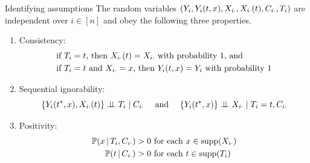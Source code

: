 \documentclass[aspectratio=169]{beamer}
\theoremstyle{remark}
\begin{document}
\begin{frame}{Identifying assumptions}
    The random variables $(Y_i, Y_i(t, x), X_{i \cdot}, X_{i \cdot}(t), C_{i \cdot}, T_i)$ are independent over $i \in [n]$ and obey the following three properties.
    \begin{enumerate}
        \item Consistency: \vspace{-3mm}
              \begin{equation*} \begin{aligned}
                       & \text{if $T_i = t$, then $\X_{i \cdot}(t) = \X_{i \cdot}$ with probability 1, and}    \\
                       & \text{if $T_i = t$ and $\X_{i \cdot} = x$, then $Y_i(t, x) = Y_i$ with probability 1}
                      \vspace{-2mm}
                  \end{aligned} \end{equation*}
        \item Sequential ignorability:
              \begin{equation*}
                  \{Y_i(t^*, x), X_{i \cdot}(t)\} \perp \!\!\! \perp T_i \mid C_{i \cdot}
                  ~~~\text{ and }~~~
                  \{Y_i(t^*, x)\} \perp \!\!\! \perp X_{i \cdot}  \mid T_i = t, C_{i \cdot}
              \end{equation*}
        \item Positivity:
              \begin{equation*}
                  \begin{aligned}
                      \P[T_i, \C_{i \cdot}]{x} & > 0 \text{ for each }  x \in \supp(\X_{i \cdot}) \\
                      \P[\C_{i \cdot}]{t}      & > 0 \text{ for each }  t \in \supp(T_i)
                  \end{aligned}
              \end{equation*}
    \end{enumerate}
\end{frame}
\end{document}
